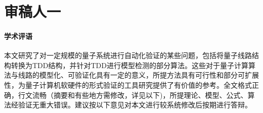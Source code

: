 \documentclass{article} %
\begin{document}

% 
% 
% 
% 

\section*{审稿人一}
\paragraph{学术评语}
本文研究了对一定规模的量子系统进行自动化验证的某些问题，包括将量子线路结构转换为TDD结构，并针对TDD进行模型检测的部分算法。这些对于量子计算算法与线路的模型化、可验证化具有一定的意义，所提方法具有可行性和部分可扩展性，为量子计算机软硬件的形式验证的工具研究提供了有价值的参考。全文格式正确，行文流畅（摘要和有些地方需修改，详见以下)，所提理论、模型、公式、算法经验证无重大错误。建议按以下意见对本文进行较系统修改后按期进行答辩。
\end{document}
